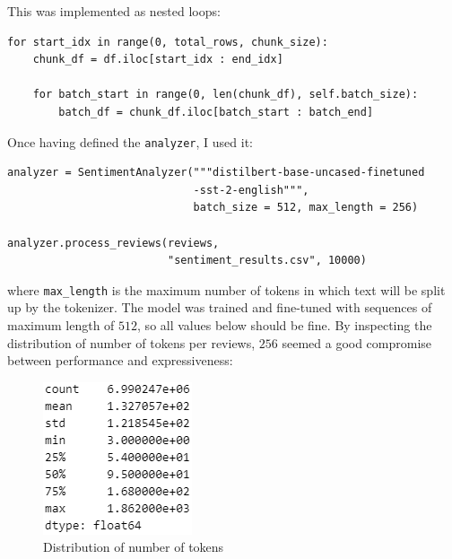 \documentclass{Configuration_Files/PoliMi3i_thesis}
\begin{document}
This was implemented as nested loops:
\begin{verbatim}
for start_idx in range(0, total_rows, chunk_size):
    chunk_df = df.iloc[start_idx : end_idx]
    
    for batch_start in range(0, len(chunk_df), self.batch_size):
        batch_df = chunk_df.iloc[batch_start : batch_end]
\end{verbatim}

Once having defined the \texttt{analyzer}, I used it:

\begin{verbatim}
analyzer = SentimentAnalyzer("""distilbert-base-uncased-finetuned
                             -sst-2-english""", 
                             batch_size = 512, max_length = 256)

analyzer.process_reviews(reviews, 
                         "sentiment_results.csv", 10000)
\end{verbatim}

where \texttt{max\_length} is the maximum number of tokens in which text will be split up by the tokenizer. The model was trained and fine-tuned with sequences of maximum length of $512$, so all values below should be fine. By inspecting the distribution of number of tokens per reviews, $256$ seemed a good compromise between performance and expressiveness:

\bigskip

\begin{figure}[H]
    \centering
    \includegraphics[width=1\columnwidth / 4]{imgs/num_tokens.png}
    \caption{Distribution of number of tokens}
    \label{fig:token_distr}
\end{figure}
\end{document}
